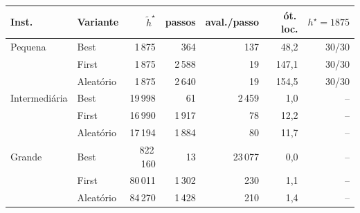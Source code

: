 \begin{tabular}{llrrrrr}
\toprule
Inst. & Variante & $\tilde h^\star$ & passos & aval./passo & ót.\,loc. & $h^\star{=}1875$ \\
\midrule
Pequena & Best & 1\,875 & 364 & 137 & 48{,}2 & 30/30 \\
 & First & 1\,875 & 2\,588 & 19 & 147{,}1 & 30/30 \\
 & Aleatório & 1\,875 & 2\,640 & 19 & 154{,}5 & 30/30 \\
\addlinespace
Intermediária & Best & 19\,998 & 61 & 2\,459 & 1{,}0 & -- \\
 & First & 16\,990 & 1\,917 & 78 & 12{,}2 & -- \\
 & Aleatório & 17\,194 & 1\,884 & 80 & 11{,}7 & -- \\
\addlinespace
Grande & Best & 822\,160 & 13 & 23\,077 & 0{,}0 & -- \\
 & First & 80\,011 & 1\,302 & 230 & 1{,}1 & -- \\
 & Aleatório & 84\,270 & 1\,428 & 210 & 1{,}4 & -- \\
\bottomrule
\end{tabular}

